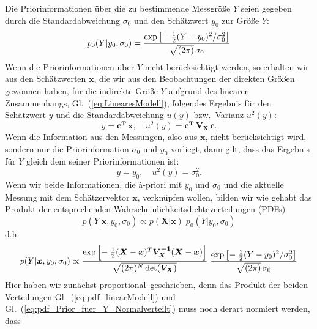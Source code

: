 Die Priorinformationen über die zu bestimmende Messgröße $Y$ seien
gegeben durch die Standardabweichung $\sigma_0$ und den Schätzwert $y_0$ zur Größe $Y$:
\begin{equation}
p_0(Y | y_0, \sigma_0) = \frac{\textstyle \exp \left[- \; \frac{1}{2} (Y - y_0)^2/\sigma_0^2 \right]}{\textstyle \sqrt{(2 \pi)} \, \sigma_0}
\label{eq:pdf_Prior_fuer_Y_Normalverteilt}
\end{equation}
Wenn die Priorinformationen über $Y$ nicht berücksichtigt werden, so
erhalten wir aus den Schätzwerten $\boldsymbol{x}$, die wir aus den Beobachtungen der
direkten Größen gewonnen haben, für die indirekte Größe
$Y$ aufgrund des linearen Zusammenhangs, Gl.~(\ref{eq:LinearesModell}), folgendes Ergebnis
für den Schätzwert $y$ und die Standardabweichung $u(y)$ bzw.\ Varianz $u^2(y)$:
\begin{equation}
y = \boldsymbol{c^T} \, \boldsymbol{x}, \quad
u^2(y) = \boldsymbol{c^T} \, \boldsymbol{V_X} \, \boldsymbol{c}.
\label{eq:nurMessung}
\end{equation}
Wenn die Information aus den Messungen, also aus $\boldsymbol{x}$, nicht berücksichtigt wird,
sondern nur die Priorinformation $\sigma_0$ und $y_0$ vorliegt,
dann gilt, dass das Ergebnis für $Y$ gleich dem seiner Priorinformationen ist:
\begin{equation}
y = y_0, \quad
u^2(y) = \sigma_0^2 .
\end{equation}
Wenn wir beide Informationen, die {\`a}-priori mit $y_0$ und $\sigma_0$ und die aktuelle
Messung mit dem Schätzervektor $\boldsymbol{x}$, verknüpfen wollen, bilden wir wie gehabt
das Produkt der entsprechenden Wahrscheinlichkeitsdichteverteilungen (PDFs)
\begin{equation}
p(Y | \boldsymbol{x}, y_0, \sigma_0) \propto
p(\boldsymbol{X} | \boldsymbol{x}) \; p_0(Y | y_0, \sigma_0)
\end{equation}
d.h.
\begin{equation}
p(Y | \boldsymbol{x}, y_0, \sigma_0) \propto
\frac{\textstyle \exp \left[- \; \frac{1}{2} (\boldsymbol{X} - \boldsymbol{x})^T \boldsymbol{V_X^{-1}} (\boldsymbol{X}-\boldsymbol{x}) \right]}{\textstyle \sqrt{(2 \pi)^N \operatorname{det}(\boldsymbol{V_X})}}
\; \frac{\textstyle \exp \left[- \; \frac{1}{2} (Y - y_0)^2/\sigma_0^2 \right]}{\textstyle \sqrt{(2 \pi)} \, \sigma_0}
\end{equation}
Hier haben wir zunächst \glqq proportional\grqq ~geschrieben, denn das Produkt
der beiden Verteilungen Gl.~(\ref{eq:pdf_linearModell}) und Gl.~(\ref{eq:pdf_Prior_fuer_Y_Normalverteilt}) muss noch derart normiert werden, dass
